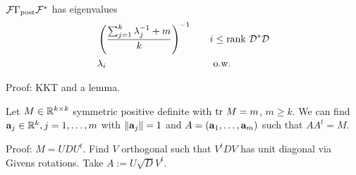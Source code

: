 \documentclass{beamer}
\begin{document}


\begin{frame}
  \begin{theorem}[D.]
    \( \mathcal{F} \Gamma_{\textup{post}} \mathcal{F}^*\)
    has eigenvalues 
    \begin{align*}
      &\left(\frac{\sum_{j=1}^k \lambda_j^{-1} + m}{k} \right )^{-1} &&\quad i \leq \textup{rank}\  \mathcal{D}^*\mathcal{D} \\
      &\lambda_i  &&\quad \text{ o.w.}
    \end{align*}
  \end{theorem}
  \pause Proof: KKT and a lemma.
\end{frame}

\begin{frame}
  \begin{lemma}[D.]
    Let $M \in \mathbb{R}^{k \times k}$ symmetric positive definite with $\textup{tr}\ M = m$, $m \geq k$. We can find $\mathbf{a}_j \in \mathbb{R}^k,j=1,\dots,m$
    with $\|\mathbf{a}_j\|=1$ and $A = (\mathbf{a}_1,\dots,\mathbf{a}_m)$ such that
    $AA^t = M$.
  \end{lemma}
  \pause Proof: $M = UDU^t$. Find $V$ orthogonal such that $V^tDV$ has
  unit diagonal via Givens rotations. Take $A := U\sqrt{D} V^t$.
\end{frame}
\end{document}
